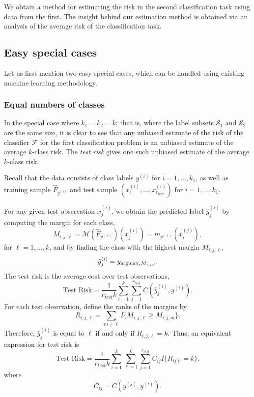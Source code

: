 \documentclass[12pt]{article}
\begin{document}
We obtain a method for estimating the risk in the second
classification task using data from the first.  The insight behind our
estimation method is obtained via an analysis of the average risk of
the classification task.

\subsection{Easy special cases}

Let us first mention two easy special cases, which can be handled
using existing machine learning methodology.

\subsubsection{Equal numbers of classes}

In the special case where $k_1 = k_2 = k$: that is, where the label
subsets $\mathcal{S}_1$ and $\mathcal{S}_2$ are the same size, it is
clear to see that any unbiased estimate of the risk of the classifier
$\mathcal{F}$ for the first classification problem is an unbiased
estimate of the average $k$-class risk.  The \emph{test risk}
gives one such unbiased estimate of the average $k$-class risk.

Recall that the data consists of class labels $y^{(i)}$ for $i =
1,\hdots, k_1$, as well as training sample $\hat{F}_{y^{(i)}}$ and
test sample $(x_1^{(i)},\hdots, x_{r_{test}}^{(i)})$ for $i =
1,\hdots, k_1$.

For any given test observation $x_j^{(i)}$, we obtain the predicted
label $\hat{y}_j^{(i)}$ by computing the margin for each class,
\[
M_{i,j,\ell} = \mathcal{M}(\hat{F}_{y^{(\ell)}})(x_j^{(i)}) =  m_{y^{(\ell)}}(x_i^{(j)}),
\]
for $\ell = 1,\hdots, k$,
and by finding the class with the highest margin $M_{i, j, \ell}$,
\[
\hat{y}_j^{(i)} = y_{\text{argmax}_\ell M_{i, j, \ell}}.
\]
The test risk is the average cost over test observations,
\begin{equation}
\text{Test Risk} = \frac{1}{r_{test}k} \sum_{i=1}^k \sum_{j=1}^{r_{test}} C(\hat{y}_j^{(i)}, y^{(i)}).
\end{equation}
For each test observation, define the ranks of the margins by
\[
R_{i,j,\ell} = \sum_{m \neq \ell} I\{M_{i,j,\ell} \geq M_{i, j, m}\}.
\]
Therefore, $\hat{y}_j^{(i)}$ is equal to $\ell$ if and only if $R_{i,j,\ell} = k$.
Thus, an equivalent expression for test risk is
\begin{equation}\label{eq:test_risk}
\text{Test Risk} = \frac{1}{r_{test}k} \sum_{i=1}^k \sum_{\ell=1}^k \sum_{j=1}^{r_{test}} C_{ij} I\{R_{ij\ell} = k\}.
\end{equation}
where
\[
C_{ij} = C(y^{(j)}, y^{(i)}).
\]
\end{document}
